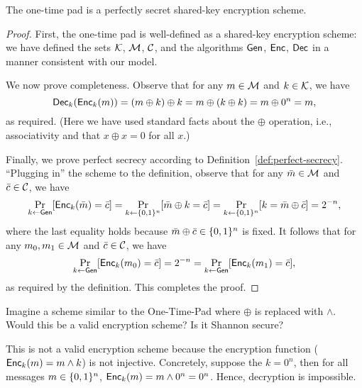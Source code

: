 \documentclass[11pt]{article}
\begin{document}
\begin{theorem}
  \label{thm:otp-perfect}
  The one-time pad is a perfectly secret shared-key encryption scheme.
\end{theorem}

\begin{proof}
  First, the one-time pad is well-defined as a shared-key encryption
  scheme: we have defined the sets $\mathcal{K}$, $\mathcal{M}$,
  $\mathcal{C}$, and the algorithms $\mathsf{Gen}$, $\mathsf{Enc}$, $\mathsf{Dec}$ in a
  manner consistent with our model.

  We now prove completeness.  Observe that for any $m \in \mathcal{M}$
  and $k \in \mathcal{K}$, we have \[ \mathsf{Dec}_{k}(\mathsf{Enc}_{k}(m)) = (m
  \oplus k) \oplus k = m \oplus (k \oplus k) = m \oplus 0^{n} = m, \]
  as required.  (Here we have used standard facts about the $\oplus$
  operation, i.e., associativity and that $x \oplus x = 0$ for all
  $x$.)

  Finally, we prove perfect secrecy according to
  Definition~\ref{def:perfect-secrecy}.  ``Plugging in'' the scheme to
  the definition, observe that for any $\bar{m} \in \mathcal{M}$ and
  $\bar{c} \in \mathcal{C}$, we have \[ \Pr_{k \gets
    \mathsf{Gen}}[\mathsf{Enc}_{k}(\bar{m}) = \bar{c}] = \Pr_{k \gets
    \{0,1\}^{n}}[\bar{m} \oplus k = \bar{c}] = \Pr_{k \gets \{0,1\}^{n}}[k =
  \bar{m} \oplus \bar{c}] = 2^{-n}, \] where the last equality holds
  because $\bar{m} \oplus \bar{c} \in \{0,1\}^{n}$ is fixed. It follows
  that for any $m_{0}, m_{1} \in \mathcal{M}$ and $\bar{c} \in
  \mathcal{C}$, we have \[ \Pr_{k \gets \mathsf{Gen}}[\mathsf{Enc}_{k}(m_{0}) =
  \bar{c}] = 2^{-n} = \Pr_{k \gets \mathsf{Gen}}[\mathsf{Enc}_{k}(m_{1}) =
  \bar{c}], \] as required by the definition.  This completes the
  proof.
\end{proof}

\begin{question}
Imagine a scheme similar to the One-Time-Pad where \(\oplus\) is replaced with
\(\land\). Would this be a valid encryption scheme? Is it Shannon secure?
\end{question}
\begin{answer}
    This is not a valid encryption scheme because the encryption function
    (\(\mathsf{Enc}_k(m) = m \land k\)) is
    not injective. Concretely, suppose the \(k = 0^n\), then for all messages \(m \in
    \{0,1\}^n\), \(\mathsf{Enc}_k(m) = m \land 0^n = 0^n\). Hence, decryption is impossible. 
\end{answer}
\end{document}
